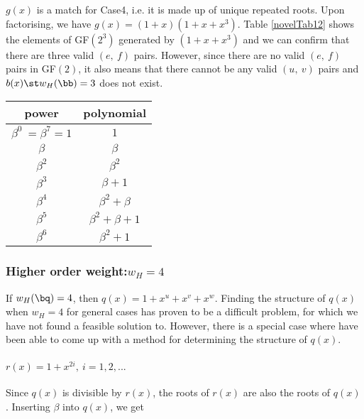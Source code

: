 \begin{example}
 $g(x)$ is a match for Case4, i.e. it is made up of unique repeated roots. Upon factorising, we have $g(x)=(1+x)(1+x+x^3)$. Table \ref{novelTab12} shows the elements of GF$(2^3)$ generated by $(1+x+x^3)$ and we can confirm that there are three valid $(e,~f)$ pairs. However, since there are no valid $(e,~f)$ pairs in GF$(2)$, it also means that there cannot be any valid $(u,~v)$ pairs and $b(x) \st w_H(\bb)=3$ does not exist.
 
 \begin{table*}[h]
 \caption{Non-zero Elements of GF$(2^3)$ generated by $1+x+x^3$}
\centering
 \begin{tabular}{c c} 
 \hline
 power & polynomial \\ [0.5ex] 
 \hline\hline
$\beta^0~=\beta^{7}=1$ & $1$\\
\hline
$\beta$ & $\beta$\\
\hline
$\beta^2$ &  $\beta^2$\\
\hline
$\beta^3$ & $\beta+1$\\
\hline
$\beta^4$ &  $\beta^2+\beta$\\
\hline
$\beta^5$ & $\beta^2+\beta+1$\\
\hline
$\beta^6$ &  $\beta^2+1$\\
 \end{tabular}
 \label{novelTab12}
\end{table*}
\end{example}



\subsubsection{Higher order weight:$w_H=4$}%
If $w_H(\bq)=4$, then $q(x) = 1+x^{u}+x^{v}+x^{w}$.
Finding the structure of $q(x)$ when $w_H=4$ for general cases has proven to be a difficult problem, for which we have not found a feasible solution to. However, there is a special case where have been able to come up with a method for determining the structure of $q(x)$. 

\paragraph{$r(x)=1+x^{2i},~i=1,2,...$}
Since $q(x)$ is divisible by $r(x)$, the roots of $r(x)$ are also the roots of $q(x)$. Inserting $\beta$ into $q(x)$, we get

